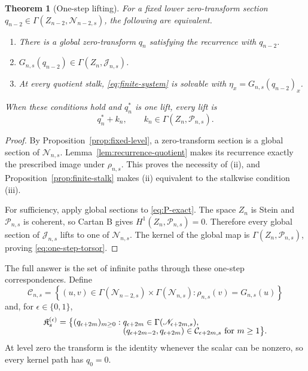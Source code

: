 \documentclass[11pt,reqno]{amsart}
\newtheorem{theorem}{Theorem}[section]
\theoremstyle{definition}
\theoremstyle{remark}
\newcommand{\cC}{\mathcal C}
\newcommand{\fK}{\mathfrak K}
\begin{document}
\begin{theorem}[One-step lifting]
\label{thm:one-step}
For a fixed lower zero-transform section
$q_{n-2}\in\Gamma(Z_{n-2},\mathscr N_{n-2,s})$, the following are equivalent.
\begin{enumerate}[label=\textup{(\roman*)}]
 \item There is a global zero-transform $q_n$ satisfying the recurrence with
 $q_{n-2}$.
 \item $G_{n,s}(q_{n-2})\in\Gamma(Z_n,\mathscr J_{n,s})$.
 \item At every quotient stalk, \eqref{eq:finite-system} is solvable with
 $\eta_x=G_{n,s}(q_{n-2})_x$.
\end{enumerate}
When these conditions hold and $q_n^*$ is one lift, every lift is
\begin{equation}
 q_n^*+k_n,
 \qquad k_n\in\Gamma(Z_n,\mathscr P_{n,s}).
 \label{eq:one-step-torsor}
\end{equation}
\end{theorem}

\begin{proof}
By Proposition~\ref{prop:fixed-level}, a zero-transform section is a global
section of $\mathscr N_{n,s}$.  Lemma~\ref{lem:recurrence-quotient} makes its
recurrence exactly the prescribed image under $\rho_{n,s}$.  This proves the
necessity of (ii), and Proposition~\ref{prop:finite-stalk} makes (ii)
equivalent to the stalkwise condition (iii).

For sufficiency, apply global sections to \eqref{eq:P-exact}.  The space
$Z_n$ is Stein and $\mathscr P_{n,s}$ is coherent, so Cartan B gives
$H^1(Z_n,\mathscr P_{n,s})=0$.  Therefore every global section of
$\mathscr J_{n,s}$ lifts to one of $\mathscr N_{n,s}$.  The kernel of the
global map is $\Gamma(Z_n,\mathscr P_{n,s})$, proving
\eqref{eq:one-step-torsor}.
\end{proof}

The full answer is the set of infinite paths through these one-step
correspondences.  Define
\begin{equation}
 \cC_{n,s}=\left\{(u,v)\in
 \Gamma(\mathscr N_{n-2,s})\times\Gamma(\mathscr N_{n,s}):
 \rho_{n,s}(v)=G_{n,s}(u)\right\}
 \label{eq:correspondence}
\end{equation}
and, for $\epsilon\in\{0,1\}$,
\begin{align}
 \fK_s^{(\epsilon)}
 =\bigl\{(q_{\epsilon+2m})_{m\ge0}:{}&
 q_{\epsilon+2m}\in\Gamma(\mathscr N_{\epsilon+2m,s}),
 \notag\\[-2mm]
 & (q_{\epsilon+2m-2},q_{\epsilon+2m})
 \in\cC_{\epsilon+2m,s}\text{ for }m\ge1\bigr\}.
 \label{eq:path-space}
\end{align}
At level zero the transform is the identity whenever the scalar can be
nonzero, so every kernel path has $q_0=0$.
\end{document}

